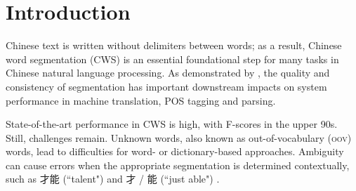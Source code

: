 \section{Introduction}

Chinese text is written without delimiters between words; as a result, Chinese word segmentation (CWS) is an essential foundational step for many tasks in Chinese natural language processing. As demonstrated by \cite{Shi:2007:IJCAI,Bai:2008:IJCNLP,Chang:2008:ACL,Kummerfeld:2013:ACL}, the quality and consistency of segmentation has important downstream impacts on system performance in machine translation, POS tagging and parsing.

State-of-the-art performance in CWS is high, with F-scores in the upper 90s. %
Still, challenges remain. Unknown words, also known as out-of-vocabulary (\textsc{oov}) words, lead to difficulties for word- or dictionary-based approaches.
Ambiguity can cause errors when the appropriate segmentation is determined contextually, such as 才能 (``talent") and 才 / 能 (``just able") \cite{Gao:2003:ACL}.

